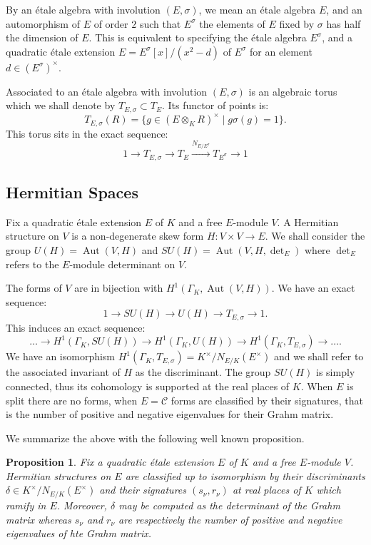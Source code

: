 \documentclass{article}
\theoremstyle{plain}
\newtheorem{proposition}[theorem]{Proposition}
\theoremstyle{definition}
\numberwithin{equation}{section}
\DeclareMathOperator{\Aut}{Aut}
\newcommand{\C}{\mathcal{C}}
\newcommand{\GalKbK}{\Gamma_K}
\begin{document}
By an \'etale algebra with involution $(E,\sigma)$, we mean an \'etale algebra $E$, and an automorphism of $E$ of order $2$ such that $E^\sigma$ the elements of $E$ fixed by $\sigma$ has half the dimension of $E$.
This is equivalent to specifying the \'etale algebra $E^\sigma$, and a quadratic \'etale extension $E = E^\sigma[x]/(x^2-d)$ of $E^\sigma$ for an element $d\in (E^\sigma)^\times$.

Associated to an \'etale algebra with involution $(E,\sigma)$ is an algebraic torus which we shall denote by $T_{E,\sigma} \subset T_E$.
Its functor of points is:
\[ T_{E,\sigma}(R) = \{ g \in (E\otimes_K R)^\times \mid g\sigma(g) = 1 \}. \]
This torus sits in the exact sequence:
\[ 1 \rightarrow  T_{E,\sigma} \rightarrow T_E \overset{N_{E/E^\sigma}}\rightarrow T_{E^\sigma} \rightarrow 1 \]


\subsection{Hermitian Spaces}

Fix a quadratic \'etale extension $E$ of $K$ and a free $E$-module $V$.
A Hermitian structure on $V$ is a non-degenerate skew form $H : V\times V \rightarrow E$.
We shall consider the group $U(H) = \Aut(V,H)$ and $SU(H) = \Aut(V,H,\det_E)$ where $\det_E$ refers to the $E$-module determinant on $V$.

The forms of $V$ are in bijection with $H^1(\GalKbK, \Aut(V,H))$.
We have an exact sequence:
\[ 1 \rightarrow SU(H) \rightarrow U(H) \rightarrow T_{E,\sigma} \rightarrow 1. \]
This induces an exact sequence:
\[ \ldots \rightarrow H^1(\GalKbK,SU(H))  \rightarrow H^1(\GalKbK,U(H))  \rightarrow H^1(\GalKbK,T_{E,\sigma}) \rightarrow \ldots. \]
We have an isomorphism $H^1(\GalKbK,T_{E,\sigma}) = K^\times/N_{E/K}(E^\times)$ and we shall refer to the associated invariant of $H$ as the discriminant.
The group $SU(H)$ is simply connected, thus its cohomology is supported at the real places of $K$.
When $E$ is split there are no forms, when $E=\C$ forms are classified by their signatures, that is the number of positive and negative eigenvalues for their Grahm matrix.

We summarize the above with the following well known proposition.
\begin{proposition}
Fix a quadratic \'etale extension $E$ of $K$ and a free $E$-module $V$.
Hermitian structures on $E$ are classified up to isomorphism by their discriminants $\delta\in K^\times/N_{E/K}(E^\times)$ and their signatures $(s_\nu,r_\nu)$ at real places of $K$ which ramify in $E$.
Moreover, $\delta$ may be computed as the determinant of the Grahm matrix whereas $s_\nu$ and $r_\nu$ are respectively the number of positive and negative eigenvalues of hte Grahm matrix.
\end{proposition}
\end{document}
